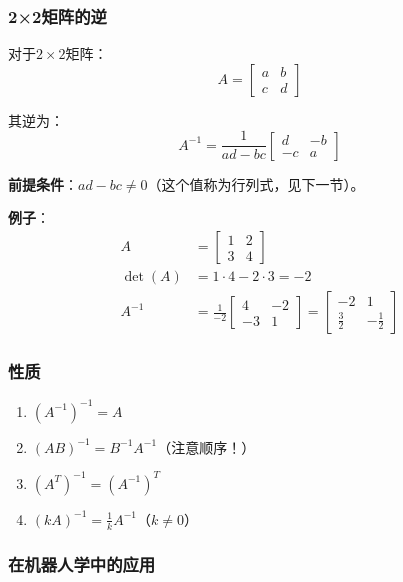 \documentclass[12pt,a4paper]{article}
\begin{document}
\subsubsection{2×2矩阵的逆}

对于$2 \times 2$矩阵：
\begin{equation}
A = \begin{bmatrix} a & b \\ c & d \end{bmatrix}
\end{equation}

其逆为：
\begin{equation}
A^{-1} = \frac{1}{ad - bc} \begin{bmatrix} d & -b \\ -c & a \end{bmatrix}
\end{equation}

\textbf{前提条件}：$ad - bc \neq 0$（这个值称为行列式，见下一节）。

\textbf{例子}：
\begin{align}
A &= \begin{bmatrix} 1 & 2 \\ 3 & 4 \end{bmatrix} \\
\det(A) &= 1 \cdot 4 - 2 \cdot 3 = -2 \\
A^{-1} &= \frac{1}{-2} \begin{bmatrix} 4 & -2 \\ -3 & 1 \end{bmatrix} = \begin{bmatrix} -2 & 1 \\ \frac{3}{2} & -\frac{1}{2} \end{bmatrix}
\end{align}

\subsubsection{性质}

\begin{enumerate}
\item $(A^{-1})^{-1} = A$
\item $(AB)^{-1} = B^{-1} A^{-1}$（注意顺序！）
\item $(A^T)^{-1} = (A^{-1})^T$
\item $(kA)^{-1} = \frac{1}{k} A^{-1}$（$k \neq 0$）
\end{enumerate}

\subsubsection{在机器人学中的应用}
\end{document}
